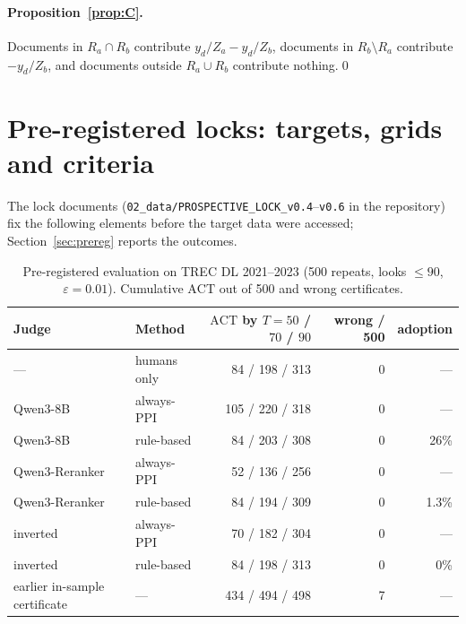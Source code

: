 \documentclass{article}
\newcommand{\eps}{\varepsilon}
\newcommand{\ACT}{\mathrm{ACT}}
\begin{document}
\paragraph{Proposition~\ref{prop:C}.} Documents in $R_a\cap R_b$ contribute $y_d/Z_a-y_d/Z_b$, documents in $R_b\setminus R_a$ contribute $-y_d/Z_b$, and documents outside $R_a\cup R_b$ contribute nothing.\qed

\section{Pre-registered locks: targets, grids and criteria}\label{app:locks}
The lock documents (\texttt{02\_data/PROSPECTIVE\_LOCK\_v0.4}--\texttt{v0.6} in the repository) fix the following elements before the target data were accessed; Section~\ref{sec:prereg} reports the outcomes.
\begin{table}[t]\centering\small
\caption{Pre-registered evaluation on TREC DL 2021--2023 (500 repeats, looks $\le90$, $\eps=0.01$). Cumulative $\ACT$ out of 500 and wrong certificates.}\label{tab:prereg}
\begin{tabular}{llrrr}\toprule
Judge & Method & $\ACT$ by $T{=}50$ / $70$ / $90$ & wrong / 500 & adoption\\\midrule
--- & humans only & 84 / 198 / 313 & 0 & ---\\
Qwen3-8B & always-PPI & 105 / 220 / 318 & 0 & ---\\
Qwen3-8B & rule-based & 84 / 203 / 308 & 0 & 26\%\\
Qwen3-Reranker & always-PPI & 52 / 136 / 256 & 0 & ---\\
Qwen3-Reranker & rule-based & 84 / 194 / 309 & 0 & 1.3\%\\
inverted & always-PPI & 70 / 182 / 304 & 0 & ---\\
inverted & rule-based & 84 / 198 / 313 & 0 & 0\%\\
earlier in-sample certificate & --- & 434 / 494 / 498 & 7 & ---\\\bottomrule
\end{tabular}
\end{table}
\end{document}
